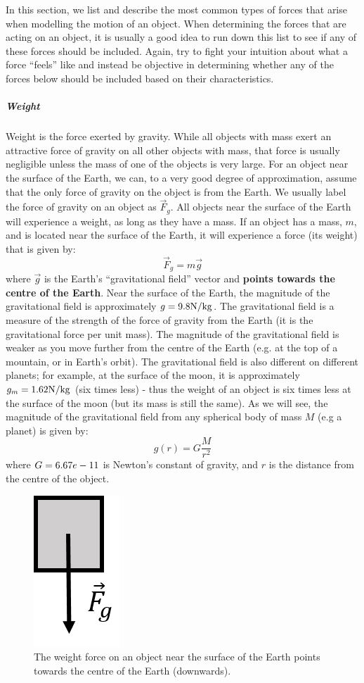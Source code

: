 In this section, we list and describe the most common types of forces that arise when modelling the motion of an object. When determining the forces that are acting on an object, it is usually a good idea to run down this list to see if any of these forces should be included. Again, try to fight your intuition about what a force ``feels'' like and instead be objective in determining whether any of the forces below should be included based on their characteristics.

\subparagraph{Weight}

Weight is the force exerted by gravity. While all objects with mass exert an attractive force of gravity on all other objects with mass, that force is usually negligible unless the mass of one of the objects is very large. For an object near the surface of the Earth, we can, to a very good degree of approximation, assume that the only force of gravity on the object is from the Earth. We usually label the force of gravity on an object as $\vec F_g$. All objects near the surface of the Earth will experience a weight, as long as they have a mass. If an object has a mass, $m$, and is located near the surface of the Earth, it will experience a force (its weight) that is given by:
\begin{equation}
\vec F_g = m\vec g
\end{equation}
where $\vec g$ is the Earth's ``gravitational field'' vector and \textbf{points towards the centre of the Earth}. Near the surface of the Earth, the magnitude of the gravitational field is approximately $g=9.8 {\rm N/kg}$. The gravitational field is a measure of the strength of the force of gravity from the Earth (it is the gravitational force per unit mass). The magnitude of the gravitational field is weaker as you move further from the centre of the Earth (e.g. at the top of a mountain, or in Earth's orbit). The gravitational field is also different on different planets; for example, at the surface of the moon, it is approximately $g_m=1.62 {\rm N/kg}$ (six times less) - thus the weight of an object is six times less at the surface of the moon (but its mass is still the same). As we will see, the magnitude of the gravitational field from any spherical body of mass $M$ (e.g a planet) is given by:
\begin{equation}
g(r) = G\frac{M}{r^2}
\end{equation}
where $G=6.67e -11 {\rm }$ is Newton's constant of gravity, and $r$ is the distance from the centre of the object.

\begin{figure}[!htbp]
\centering
\includegraphics[width=0.1\linewidth]{files/weight-4fe1d7363b0c9d71f9252a9abe66caed.png}
\caption[]{The weight force on an object near the surface of the Earth points towards the centre of the Earth (downwards).}
\label{fig:newtonslaws:weight}
\end{figure}

